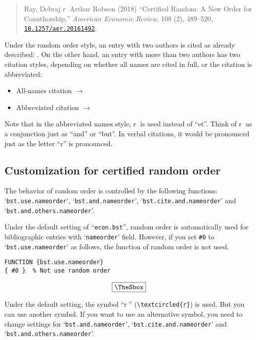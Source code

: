 \documentclass[10pt]{article}
\newenvironment{Frame}%
{\setlength{\fboxsep}{15pt}
\setlength{\mylength}{\linewidth}%
\addtolength{\mylength}{-2\fboxsep}%
\addtolength{\mylength}{-2\fboxrule}%
\Sbox
\minipage{\mylength}%
\setlength{\abovedisplayskip}{0pt}%
\setlength{\belowdisplayskip}{0pt}%
}%
{\endminipage\endSbox
\[\fbox{\TheSbox}\]}
\begin{document}
\begin{quote}
Ray, Debraj \textcircled{r} Arthur Robson (2018) ``Certified Random: A New
Order for Coauthorship,'' \textit{American Economic Review}, 108 (2),
489--520, \href{http://dx.doi.org/10.1257/aer.20161492}{
\nolinkurl{10.1257/aer.20161492}}.
\end{quote}

Under the random order style, an entry with two authors is cited as already
described: \citet{10.1257/aer.20161492}. On the other hand, an entry with more
than two authors has two citation styles, depending on whether all names are
cited in full, or the citation is abbreviated:
\begin{itemize}
 \item All-names citation $\longrightarrow$ \citet*{NBERw25205}
 \item Abbreviated citation $\longrightarrow$ \citet{NBERw25205}
\end{itemize}

Note that in the abbreviated names style, \textcircled{r} is used instead of
``et''. Think of \textcircled{r} as a conjunction just as ``and'' or ``but''. In
verbal citations, it would be pronounced just as the letter ``r'' is pronounced.

\subsection{Customization for certified random order}

The behavior of random order is controlled by the following functions:
`\texttt{bst.use.nameorder}', `\texttt{bst.and.nameorder}',
`\texttt{bst.cite.and.nameorder}' and `\texttt{bst.and.others.nameorder}'.
\vspace*{1em}

Under the default setting of ``\texttt{econ.bst}'', random order is
automatically used for bibliographic entries with `\texttt{nameorder}' field.
However, if you set \verb|#0| to `\texttt{bst.use.nameorder}' as follows, the
function of random order is not used.
\begin{Frame}
\begin{verbatim}
FUNCTION {bst.use.nameorder}
{ #0 }  % Not use random order
\end{verbatim}
\end{Frame}

Under the default setting, the symbol ``\textcircled{r}''
(\verb|\textcircled{r}|) is used.  But you can use another symbol. If you want
to use an alternative symbol, you need to change settings for
`\texttt{bst.and.nameorder}', `\texttt{bst.cite.and.nameorder}' and
`\texttt{bst.and.others.nameorder}'.
\end{document}
